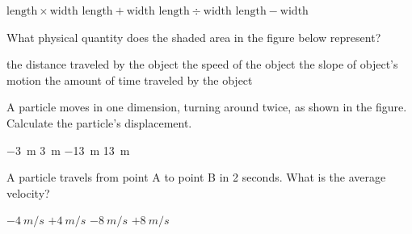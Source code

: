 \documentclass[]{exam}
\begin{document}
\begin{questions}
\begin{randomizechoices}
    \correctchoice $\mathrm{length \times width}$
    \choice $\mathrm{length + width}$
    \choice $\mathrm{length \div width}$
    \choice $\mathrm{length - width}$
\end{randomizechoices}

\question
What physical quantity does the shaded area in the figure below represent?

\begin{center}
\end{center}

\begin{randomizechoices}
    \correctchoice the distance traveled by the object
    \choice the speed of the object
    \choice the slope of object's motion
    \choice the amount of time traveled by the object
\end{randomizechoices}

\question
A particle moves in one dimension, turning around twice, as shown in the figure. Calculate the particle's displacement.



\begin{randomizechoices}
    \correctchoice \SI{-3}{m}
    \choice \SI{3}{m}
    \choice \SI{-13}{m}
    \choice \SI{13}{m}
\end{randomizechoices}


\question
A particle travels from point A to point B in 2 seconds. What is the average velocity?


\begin{randomizechoices}
    \correctchoice $-\SI{4}{m/s}$
    \choice $+\SI{4}{m/s}$
    \choice $-\SI{8}{m/s}$
    \choice $+\SI{8}{m/s}$
\end{randomizechoices}


\end{questions}
\end{document}
